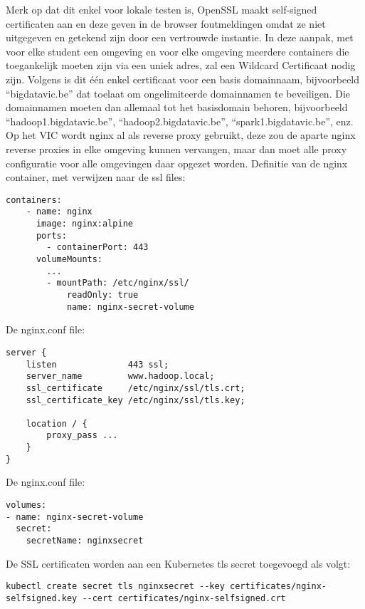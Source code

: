 Merk op dat dit enkel voor lokale testen is, OpenSSL maakt self-signed certificaten aan en deze geven in de browser foutmeldingen omdat ze niet uitgegeven en getekend zijn door een vertrouwde instantie.
\newline
In deze aanpak, met voor elke student een omgeving en voor elke omgeving meerdere containers die toegankelijk moeten zijn via een uniek adres, zal een Wildcard Certificaat nodig zijn. \sloppypar Volgens \textcite{Digicert2023} is dit één enkel certificaat voor een basis domainnaam, bijvoorbeeld ``bigdatavic.be'' dat toelaat om ongelimiteerde domainnamen te beveiligen. Die domainnamen moeten dan allemaal tot het basisdomain behoren, bijvoorbeeld ``hadoop1.bigdatavic.be'', ``hadoop2.bigdatavic.be'', ``spark1.bigdatavic.be'', enz.
\newline
Op het VIC wordt nginx al als reverse proxy gebruikt, deze zou de aparte nginx reverse proxies in elke omgeving kunnen vervangen, maar dan moet alle proxy configuratie voor alle omgevingen daar opgezet worden.
\newline
\newline
Definitie van de nginx container, met verwijzen naar de ssl files:
\begin{lstlisting}
containers:
    - name: nginx
      image: nginx:alpine
      ports:
        - containerPort: 443
      volumeMounts:
        ...
        - mountPath: /etc/nginx/ssl/
            readOnly: true
            name: nginx-secret-volume
\end{lstlisting}

De nginx.conf file:
\begin{lstlisting}
server {
    listen              443 ssl;
    server_name         www.hadoop.local;
    ssl_certificate     /etc/nginx/ssl/tls.crt;
    ssl_certificate_key /etc/nginx/ssl/tls.key;
    
    location / {
        proxy_pass ...
    }
}
\end{lstlisting}

De nginx.conf file:
\begin{lstlisting}
volumes:
- name: nginx-secret-volume
  secret:
    secretName: nginxsecret
\end{lstlisting}


De SSL certificaten worden aan een Kubernetes tls secret toegevoegd als volgt:
\begin{lstlisting}
kubectl create secret tls nginxsecret --key certificates/nginx-selfsigned.key --cert certificates/nginx-selfsigned.crt
\end{lstlisting}

